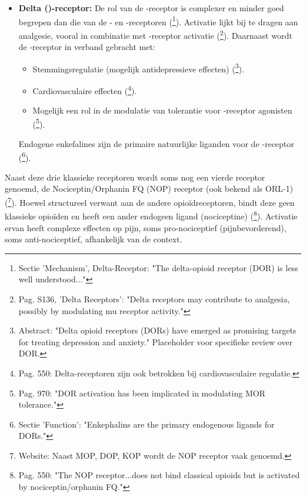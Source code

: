 \documentclass[11pt, a4paper]{report} %
\begin{document}
\begin{itemize}
    \item \textbf{Delta (\textdelta)-receptor:} De rol van de \textdelta-receptor is complexer en minder goed begrepen dan die van de \textmu- en \textkappa-receptoren (\cite{StatPearlsOpioidReceptor}\footnote{Sectie 'Mechanism', Delta-Receptor: "The delta-opioid receptor (DOR) is less well understood..."}). Activatie lijkt bij te dragen aan analgesie, vooral in combinatie met \textmu-receptor activatie (\cite{Trescot2008OpioidPharm}\footnote{Pag. S136, 'Delta Receptors': "Delta receptors may contribute to analgesia, possibly by modulating mu receptor activity."}). Daarnaast wordt de \textdelta-receptor in verband gebracht met:
        \begin{itemize}
            \item Stemmingsregulatie (mogelijk antidepressieve effecten) (\cite{Pradhan2011DeltaOpioidReceptor}\footnote{Abstract: "Delta opioid receptors (DORs) have emerged as promising targets for treating depression and anxiety." Placeholder voor specifieke review over DOR.}).
            \item Cardiovasculaire effecten (\cite{GutsteinAkil2006OpioidAnalgesics}\footnote{Pag. 550: Delta-receptoren zijn ook betrokken bij cardiovasculaire regulatie.}).
            \item Mogelijk een rol in de modulatie van tolerantie voor \textmu-receptor agonisten (\cite{Shang2020MolecularBasis}\footnote{Pag. 970: "DOR activation has been implicated in modulating MOR tolerance."}).
        \end{itemize}
        Endogene enkefalines zijn de primaire natuurlijke liganden voor de \textdelta-receptor (\cite{StatPearlsOpioidReceptor}\footnote{Sectie 'Function': "Enkephalins are the primary endogenous ligands for DORs."}).
\end{itemize}
Naast deze drie klassieke receptoren wordt soms nog een vierde receptor genoemd, de Nociceptin/Orphanin FQ (NOP) receptor (ook bekend als ORL-1) (\cite{IUPHAROpioidReceptors}\footnote{Website: Naast MOP, DOP, KOP wordt de NOP receptor vaak genoemd.}). Hoewel structureel verwant aan de andere opioïdreceptoren, bindt deze geen klassieke opioïden en heeft een ander endogeen ligand (nociceptine) (\cite{GutsteinAkil2006OpioidAnalgesics}\footnote{Pag. 550: "The NOP receptor...does not bind classical opioids but is activated by nociceptin/orphanin FQ."}). Activatie ervan heeft complexe effecten op pijn, soms pro-nociceptief (pijnbevorderend), soms anti-nociceptief, afhankelijk van de context.
\end{document}
